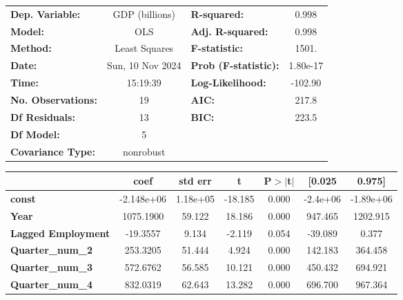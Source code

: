\documentclass[11pt]{article}
\begin{document}
    \begin{center}
\begin{tabular}{lclc}
\toprule
\textbf{Dep. Variable:}    &  GDP (billions)  & \textbf{  R-squared:         } &     0.998   \\
\textbf{Model:}            &       OLS        & \textbf{  Adj. R-squared:    } &     0.998   \\
\textbf{Method:}           &  Least Squares   & \textbf{  F-statistic:       } &     1501.   \\
\textbf{Date:}             & Sun, 10 Nov 2024 & \textbf{  Prob (F-statistic):} &  1.80e-17   \\
\textbf{Time:}             &     15:19:39     & \textbf{  Log-Likelihood:    } &   -102.90   \\
\textbf{No. Observations:} &          19      & \textbf{  AIC:               } &     217.8   \\
\textbf{Df Residuals:}     &          13      & \textbf{  BIC:               } &     223.5   \\
\textbf{Df Model:}         &           5      & \textbf{                     } &             \\
\textbf{Covariance Type:}  &    nonrobust     & \textbf{                     } &             \\
\bottomrule
\end{tabular}
\begin{tabular}{lcccccc}
                           & \textbf{coef} & \textbf{std err} & \textbf{t} & \textbf{P$> |$t$|$} & \textbf{[0.025} & \textbf{0.975]}  \\
\midrule
\textbf{const}             &   -2.148e+06  &     1.18e+05     &   -18.185  &         0.000        &     -2.4e+06    &    -1.89e+06     \\
\textbf{Year}              &    1075.1900  &       59.122     &    18.186  &         0.000        &      947.465    &     1202.915     \\
\textbf{Lagged Employment} &     -19.3557  &        9.134     &    -2.119  &         0.054        &      -39.089    &        0.377     \\
\textbf{Quarter\_num\_2}   &     253.3205  &       51.444     &     4.924  &         0.000        &      142.183    &      364.458     \\
\textbf{Quarter\_num\_3}   &     572.6762  &       56.585     &    10.121  &         0.000        &      450.432    &      694.921     \\
\textbf{Quarter\_num\_4}   &     832.0319  &       62.643     &    13.282  &         0.000        &      696.700    &      967.364     \\

\end{tabular}
\end{center}
\end{document}
